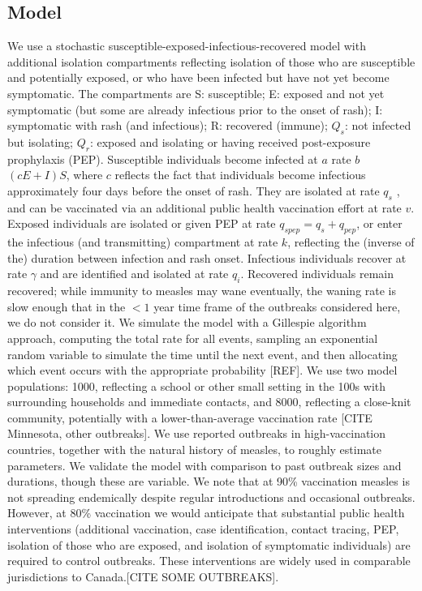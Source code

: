 \documentclass[12pt,a4paper]{article}
\begin{document}
\subsection{Model}
We use a stochastic susceptible-exposed-infectious-recovered model with additional isolation compartments reflecting isolation of those who are susceptible and potentially exposed, or who have been infected but have not yet become symptomatic. The compartments are S: susceptible; E: exposed and not yet symptomatic (but some are already infectious prior to the onset of rash); I: symptomatic with rash (and infectious); R: recovered (immune); $Q_s$: not infected but isolating; $Q_r$: exposed and isolating or having received post-exposure prophylaxis (PEP). Susceptible individuals become infected at $a$ rate $b$ $(cE + I) S$, where $c$ reflects the fact that individuals become infectious approximately four days before the onset of rash. They are isolated at rate $q_s$ , and can be vaccinated via an additional public health vaccination effort at rate $v$. Exposed individuals are isolated or given PEP at rate $q_{spep}  = q_s + q_{pep}$, or enter the infectious (and transmitting) compartment at rate $k$, reflecting the (inverse of the) duration between infection and rash onset. Infectious individuals recover at rate $\gamma$ and are identified and isolated at rate $q_i$. Recovered individuals remain recovered; while immunity to measles may wane eventually, the waning rate is slow enough that in the $<1$ year time frame of the outbreaks considered here, we do not consider it.  We simulate the model with a Gillespie algorithm approach, computing the total rate for all events, sampling an exponential random variable to simulate the time until the next event, and then allocating which event occurs with the appropriate probability [REF].
We use two model populations: 1000, reflecting a school or other small setting in the 100s with surrounding households and immediate contacts, and 8000, reflecting a close-knit community, potentially with a lower-than-average vaccination rate [CITE Minnesota, other outbreaks].
We use reported outbreaks in high-vaccination countries, together with the natural history of measles, to roughly estimate parameters. We validate the model with comparison to past outbreak sizes and durations, though these are variable. We note that at 90\% vaccination measles is not spreading endemically despite regular introductions and occasional outbreaks. However, at 80\% vaccination we would anticipate that substantial public health interventions (additional vaccination, case identification, contact tracing, PEP, isolation of those who are exposed, and isolation of symptomatic individuals) are required to control outbreaks. These interventions are widely used in comparable jurisdictions to Canada.[CITE SOME OUTBREAKS].
\end{document}
